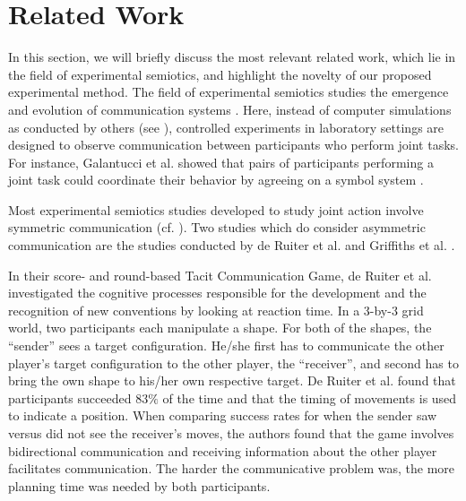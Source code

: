 \section{Related Work}

In this section, we will briefly discuss the most relevant related work, which lie in the field of experimental semiotics, and highlight the novelty of our proposed experimental method.
The field of experimental semiotics studies the emergence and evolution of communication systems \cite{galantucci2009experimental}. Here, instead of computer simulations as conducted by others (see \cite{cangelosi2002simulating,steels2012experiments}), controlled experiments in laboratory settings are designed to observe communication between participants who perform joint tasks. For instance, Galantucci et al. showed that pairs of participants performing a joint task could coordinate their behavior by agreeing on a symbol system \cite{galantucci2005experimental}.

Most experimental semiotics studies developed to study joint action involve symmetric communication (cf. \cite{Galantucci2011experimental}).
Two studies which do consider asymmetric communication are the studies conducted by de Ruiter et al. \cite{de2010exploring} and Griffiths et al. \cite{griffiths2012bottom}. 

In their score- and round-based Tacit Communication Game, de Ruiter et al. investigated the cognitive processes responsible for the development and the recognition of new conventions by looking at reaction time. In a 3-by-3 grid world, two participants each manipulate a shape. For both of the shapes, the ``sender'' sees a target configuration. He/she first has to communicate the other player's target configuration to the other player, the ``receiver'', and second has to bring the own shape to his/her own respective target.
De Ruiter et al. found that participants succeeded $83\%$ of the time and that the timing of movements is used to indicate a position. When comparing success rates for when the sender saw versus did not see the receiver's moves, the authors found that the game involves bidirectional communication and receiving information about the other player facilitates communication. The harder the communicative problem was, the more planning time was needed by both participants.

